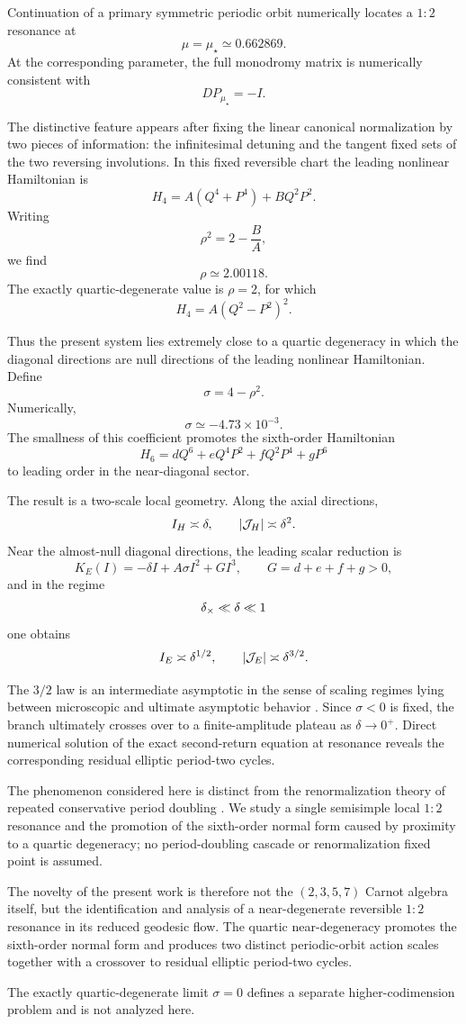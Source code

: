 Continuation of a primary symmetric periodic orbit numerically locates a \(1{:}2\) resonance at
\[
\mu=\mu_\star\simeq0.662869.
\]
At the corresponding parameter, the full monodromy matrix is numerically consistent with
\[
DP_{\mu_\star}=-I.
\]

The distinctive feature appears after fixing the linear canonical normalization by two pieces of information: the infinitesimal detuning and the tangent fixed sets of the two reversing involutions. In this fixed reversible chart the leading nonlinear Hamiltonian is
\[
H_4=A(Q^4+P^4)+BQ^2P^2.
\]
Writing
\[
\rho^2=2-\frac BA,
\]
we find
\[
\rho\simeq2.00118.
\]
The exactly quartic-degenerate value is \(\rho=2\), for which
\[
H_4=A(Q^2-P^2)^2.
\]

Thus the present system lies extremely close to a quartic degeneracy in which the diagonal directions are null directions of the leading nonlinear Hamiltonian. Define
\[
\sigma=4-\rho^2.
\]
Numerically,
\[
\sigma\simeq-4.73\times10^{-3}.
\]
The smallness of this coefficient promotes the sixth-order Hamiltonian
\[
H_6=dQ^6+eQ^4P^2+fQ^2P^4+gP^6
\]
to leading order in the near-diagonal sector.

The result is a two-scale local geometry. Along the axial directions,
\[
I_H\asymp\delta,\qquad |\mathcal{J}_H|\asymp\delta^2.
\]
Near the almost-null diagonal directions, the leading scalar reduction is
\[
K_E(I)=-\delta I+A\sigma I^2+GI^3,
\qquad G=d+e+f+g>0,
\]
and in the regime
\[
\delta_\times\ll\delta\ll1
\]
one obtains
\[
I_E\asymp\delta^{1/2},
\qquad
|\mathcal{J}_E|\asymp\delta^{3/2}.
\]

The \(3/2\) law is an intermediate asymptotic in the sense of scaling regimes lying between microscopic and ultimate asymptotic behavior \cite{Barenblatt1996}. Since \(\sigma<0\) is fixed, the branch ultimately crosses over to a finite-amplitude plateau as \(\delta\to0^+\). Direct numerical solution of the exact second-return equation at resonance reveals the corresponding residual elliptic period-two cycles.

The phenomenon considered here is distinct from the renormalization theory of repeated conservative period doubling \cite{GaidashevKoch2011}. We study a single semisimple local \(1{:}2\) resonance and the promotion of the sixth-order normal form caused by proximity to a quartic degeneracy; no period-doubling cascade or renormalization fixed point is assumed.

The novelty of the present work is therefore not the \((2,3,5,7)\) Carnot algebra itself, but the identification and analysis of a near-degenerate reversible \(1{:}2\) resonance in its reduced geodesic flow. The quartic near-degeneracy promotes the sixth-order normal form and produces two distinct periodic-orbit action scales together with a crossover to residual elliptic period-two cycles.

The exactly quartic-degenerate limit \(\sigma=0\) defines a separate higher-codimension problem and is not analyzed here.
